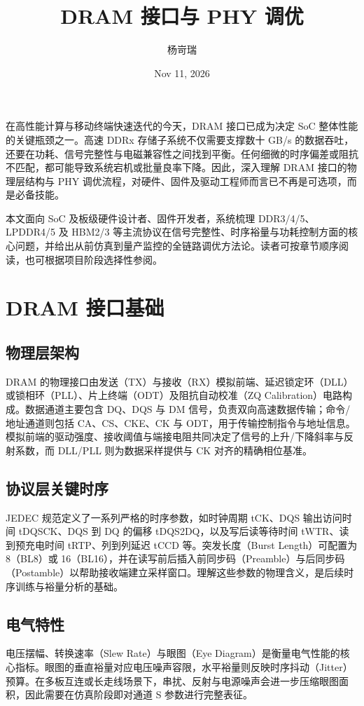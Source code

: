 \title{DRAM 接口与 PHY 调优}
\author{杨岢瑞}
\date{Nov 11, 2026}
\maketitle
在高性能计算与移动终端快速迭代的今天，DRAM 接口已成为决定 SoC 整体性能的关键瓶颈之一。高速 DDRx 存储子系统不仅需要支撑数十 GB/s 的数据吞吐，还要在功耗、信号完整性与电磁兼容性之间找到平衡。任何细微的时序偏差或阻抗不匹配，都可能导致系统宕机或批量良率下降。因此，深入理解 DRAM 接口的物理层结构与 PHY 调优流程，对硬件、固件及驱动工程师而言已不再是可选项，而是必备技能。\par
本文面向 SoC 及板级硬件设计者、固件开发者，系统梳理 DDR3/4/5、LPDDR4/5 及 HBM2/3 等主流协议在信号完整性、时序裕量与功耗控制方面的核心问题，并给出从前仿真到量产监控的全链路调优方法论。读者可按章节顺序阅读，也可根据项目阶段选择性参阅。\par
\chapter{DRAM 接口基础}
\section{物理层架构}
DRAM 的物理接口由发送（TX）与接收（RX）模拟前端、延迟锁定环（DLL）或锁相环（PLL）、片上终端（ODT）及阻抗自动校准（ZQ Calibration）电路构成。数据通道主要包含 DQ、DQS 与 DM 信号，负责双向高速数据传输；命令/地址通道则包括 CA、CS、CKE、CK 与 ODT，用于传输控制指令与地址信息。模拟前端的驱动强度、接收阈值与端接电阻共同决定了信号的上升/下降斜率与反射系数，而 DLL/PLL 则为数据采样提供与 CK 对齐的精确相位基准。\par
\section{协议层关键时序}
JEDEC 规范定义了一系列严格的时序参数，如时钟周期 tCK、DQS 输出访问时间 tDQSCK、DQS 到 DQ 的偏移 tDQS2DQ，以及写后读等待时间 tWTR、读到预充电时间 tRTP、列到列延迟 tCCD 等。突发长度（Burst Length）可配置为 8（BL8）或 16（BL16），并在读写前后插入前同步码（Preamble）与后同步码（Postamble）以帮助接收端建立采样窗口。理解这些参数的物理含义，是后续时序训练与裕量分析的基础。\par
\section{电气特性}
电压摆幅、转换速率（Slew Rate）与眼图（Eye Diagram）是衡量电气性能的核心指标。眼图的垂直裕量对应电压噪声容限，水平裕量则反映时序抖动（Jitter）预算。在多板互连或长走线场景下，串扰、反射与电源噪声会进一步压缩眼图面积，因此需要在仿真阶段即对通道 S 参数进行完整表征。\par
